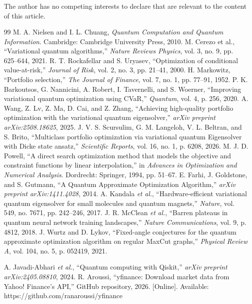 \documentclass[runningheads]{llncs}
\begin{document}
\begin{credits}
\subsubsection{\discintname}
The author has no competing interests to declare that are relevant to the content of this article.
\end{credits}

\begin{thebibliography}{99}
M. A. Nielsen and I. L. Chuang, \textit{Quantum Computation 
and Quantum Information}. Cambridge: Cambridge University 
Press, 2010.
M. Cerezo et al., ``Variational quantum algorithms,'' 
\textit{Nature Reviews Physics}, vol. 3, no. 9, 
pp. 625--644, 2021.
R. T. Rockafellar and S. Uryasev, ``Optimization of conditional 
value-at-risk,'' \textit{Journal of Risk}, vol. 2, no. 3, 
pp. 21--41, 2000.
H. Markowitz, ``Portfolio selection,'' \textit{The Journal 
of Finance}, vol. 7, no. 1, pp. 77--91, 1952.
P. K. Barkoutsos, G. Nannicini, A. Robert, I. Tavernelli, 
and S. Woerner, ``Improving variational quantum optimization 
using CVaR,'' \textit{Quantum}, vol. 4, p. 256, 2020.
A. Wang, Z. Lv, Z. Ma, D. Cai, and Z. Zhang, ``Achieving
high-quality portfolio optimization with the variational
quantum eigensolver,'' \textit{arXiv preprint arXiv:2508.18625}, 2025.
J. V. S. Scursulim, G. M. Langeloh, V. L. Beltran, and
S. Brito, ``Multiclass portfolio optimization via variational
quantum Eigensolver with Dicke state ansatz,''
\textit{Scientific Reports}, vol. 16, no. 1, p. 6208, 2026.
M. J. D. Powell, ``A direct search optimization method 
that models the objective and constraint functions by 
linear interpolation,'' in \textit{Advances in 
Optimization and Numerical Analysis}. Dordrecht: 
Springer, 1994, pp. 51--67.
E. Farhi, J. Goldstone, and S. Gutmann, ``A Quantum Approximate Optimization Algorithm,'' \textit{arXiv preprint arXiv:1411.4028}, 2014.
A. Kandala \textit{et al.}, ``Hardware-efficient variational quantum eigensolver for small molecules and quantum magnets,'' \textit{Nature}, vol. 549, no. 7671, pp. 242--246, 2017.
J. R. McClean \textit{et al.}, ``Barren plateaus in quantum neural network training landscapes,'' \textit{Nature Communications}, vol. 9, p. 4812, 2018.
J. Wurtz and D. Lykov, ``Fixed-angle conjectures for the quantum approximate optimization algorithm on regular MaxCut graphs,'' \textit{Physical Review A}, vol. 104, no. 5, p. 052419, 2021.

A. Javadi-Abhari \textit{et al.}, ``Quantum computing with Qiskit,'' \textit{arXiv preprint arXiv:2405.08810}, 2024.
R. Aroussi, ``yfinance: Download market data from Yahoo! Finance's API,'' GitHub repository, 2026. [Online]. Available: https://github.com/ranaroussi/yfinance
\end{thebibliography}
\end{document}
